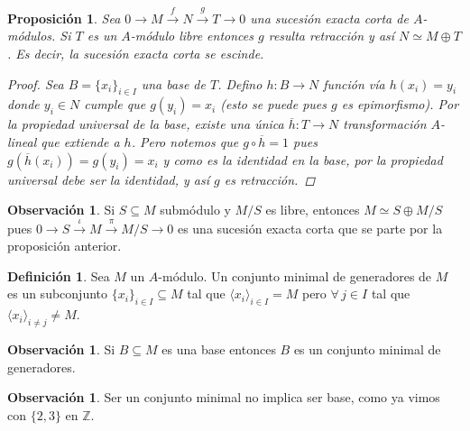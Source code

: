 \documentclass[12pt]{book}
\newtheorem{prop}[teo]{Proposición}
\theoremstyle{definition}
\newtheorem{obs}[teo]{Observación}
\newtheorem{defn}[teo]{Definición}
\newcommand{\ZZ}{\mathbb{Z}}      %
\begin{document}
\begin{prop}
Sea $0\longrightarrow M\stackrel{f}{\longrightarrow} N\stackrel{g}{\longrightarrow} T\longrightarrow 0$ una sucesión exacta corta de $A$-módulos. Si $T$ es un $A$-módulo libre entonces $g$ resulta retracción y así $N\simeq M\oplus T$. Es decir, la sucesión exacta corta se escinde.
\begin{proof}
Sea $B=\{x_i\}_{i\in I}$ una base de $T$. Defino $h:B\to N$ función vía $h(x_i)=y_i$ donde $y_i\in N$ cumple que $g(y_i)=x_i$ (esto se puede pues $g$ es epimorfismo). Por la propiedad universal de la base, existe una única $\overline{h}:T\to N$ transformación $A$-lineal que extiende a $h$. Pero notemos que $g\circ \overline{h}=1$ pues $g(\overline{h}(x_i)) = g(y_i) = x_i$ y como es la identidad en la base, por la propiedad universal debe ser la identidad, y así $g$ es retracción.
\end{proof}
\end{prop}

\begin{obs}
Si $S\subseteq M$ submódulo y $M/S$ es libre, entonces $M\simeq S\oplus M/S$ pues $0\longrightarrow S\stackrel{\iota}{\longrightarrow} M\stackrel{\pi}{\longrightarrow} M/S\longrightarrow 0$ es una sucesión exacta corta que se parte por la proposición anterior.
\end{obs}

\begin{defn}
Sea $M$ un $A$-módulo. Un conjunto minimal de generadores de $M$ es un subconjunto $\{x_i\}_{i\in I}\subseteq M$ tal que $\langle x_i\rangle_{i\in I} = M$ pero $\forall \, j\in I$ tal que $\langle x_i\rangle_{i\neq j} \neq M$. 
\end{defn}

\begin{obs}
Si $B\subseteq M$ es una base entonces $B$ es un conjunto minimal de generadores.
\end{obs}

\begin{obs}
Ser un conjunto minimal no implica ser base, como ya vimos con $\{2,3\}$ en $\ZZ$.
\end{obs}
\end{document}
